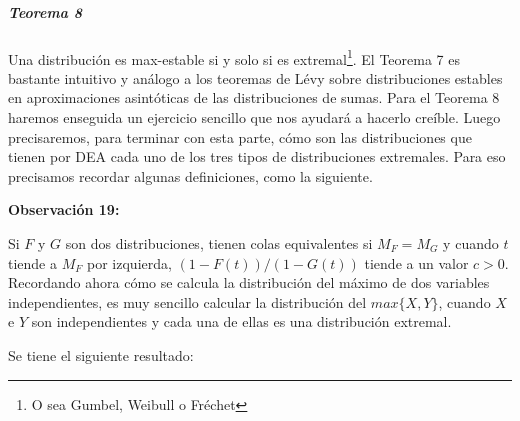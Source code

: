 \documentclass[
  oneside]{article}
\begin{document}
\hypertarget{teorema-8}{%
\subparagraph{Teorema 8}\label{teorema-8}}

Una distribución es max-estable si y solo si es
extremal\footnote{O sea Gumbel, Weibull o Fréchet}. El Teorema 7 es
bastante intuitivo y análogo a los teoremas de Lévy sobre distribuciones
estables en aproximaciones asintóticas de las distribuciones de sumas.
Para el Teorema 8 haremos enseguida un ejercicio sencillo que nos
ayudará a hacerlo creíble. Luego precisaremos, para terminar con esta
parte, cómo son las distribuciones que tienen por DEA cada uno de los
tres tipos de distribuciones extremales. Para eso precisamos recordar
algunas definiciones, como la siguiente.

\textbf{Observación 19:}

Si \(F\) y \(G\) son dos distribuciones, tienen colas equivalentes si
\(M_F=M_G\) y cuando \(t\) tiende a \(M_F\) por izquierda,
\((1-F(t))/(1-G(t))\) tiende a un valor \(c>0\). Recordando ahora cómo
se calcula la distribución del máximo de dos variables independientes,
es muy sencillo calcular la distribución del \(max\{X,Y\}\), cuando
\(X\) e \(Y\) son independientes y cada una de ellas es una distribución
extremal.

Se tiene el siguiente resultado:
\end{document}
